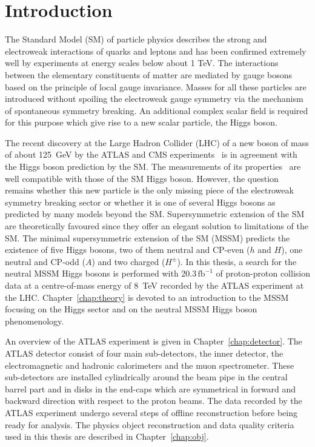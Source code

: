 \chapter{Introduction}

 
The Standard Model (SM) of particle physics  describes the strong and electroweak interactions
of quarks and leptons and has been confirmed extremely well by experiments at energy scales below about 1 TeV. 
The interactions between the elementary constituents of matter are mediated by gauge bosons 
based on the principle of local gauge invariance.
Masses for all these  particles are introduced without spoiling the electroweak gauge symmetry 
via the mechanism of spontaneous symmetry breaking. An additional complex scalar field is required for this
purpose which give rise to a new scalar particle, the Higgs boson.

The recent discovery at the  Large Hadron Collider (LHC) of a new boson of mass
of about 125~GeV by the ATLAS and CMS experiments~\cite{AHiggsO,CHiggsO} is in agreement with the 
Higgs boson prediction by the SM. The measurements  of its properties~\cite{ASpin0,ACouplings,CFermions,CWidth}
are well compatible with those of the SM Higgs boson. However, the question remains 
whether this new particle is the only missing piece of the electroweak symmetry breaking
sector or whether it is one of several Higgs bosons as predicted by many models beyond the SM.
Supersymmetric extension of the SM are theoretically favoured since they
offer an elegant solution to limitations of the SM.
The minimal supersymmetric extension of the SM (MSSM) predicts the existence
of five Higgs bosons, two of them neutral and CP-even ($h$ and $H$), one neutral and CP-odd ($A$) and two charged ($H^{\pm}$).
In this thesis, a search for the neutral MSSM Higgs bosons is performed with 20.3$\,\text{fb}^{-1}$ of
proton-proton collision data at a centre-of-mass energy of 8~TeV recorded by the ATLAS experiment at the LHC. 
Chapter~\ref{chap:theory} is devoted to an  introduction to the MSSM focusing  on the Higgs sector
and on the neutral MSSM Higgs boson phenomenology.

An overview of the ATLAS experiment is given in Chapter~\ref{chap:detector}. 
The ATLAS detector consist of four main sub-detectors, the inner detector,
the electromagnetic and hadronic calorimeters and the muon spectrometer. These sub-detectors are installed 
cylindrically around the beam pipe in the central barrel part and in disks in the end-caps which are symmetrical in
forward and backward direction with respect to the proton beams.
The data recorded by the ATLAS experiment undergo several steps of offline reconstruction 
before being ready for analysis. The physics object reconstruction and data quality criteria used in this thesis are described in 
Chapter~\ref{chap:obj}.

